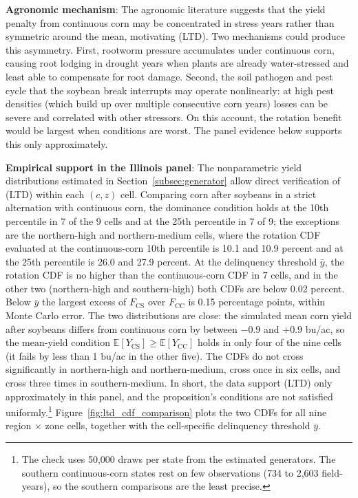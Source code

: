\documentclass[11pt,letterpaper]{article}
\theoremstyle{remark}
\begin{document}
\textbf{Agronomic mechanism}: The agronomic literature suggests that the yield penalty from continuous corn may be concentrated in stress years rather than symmetric around the mean, motivating (LTD). Two mechanisms could produce this asymmetry. First, rootworm pressure accumulates under continuous corn, causing root lodging in drought years when plants are already water-stressed and least able to compensate for root damage. Second, the soil pathogen and pest cycle that the soybean break interrupts may operate nonlinearly: at high pest densities (which build up over multiple consecutive corn years) losses can be severe and correlated with other stressors. On this account, the rotation benefit would be largest when conditions are worst. The panel evidence below supports this only approximately.
 
\textbf{Empirical support in the Illinois panel}: The nonparametric yield distributions estimated in Section~\ref{subsec:generator} allow direct verification of (LTD) within each $(c,z)$ cell. Comparing corn after soybeans in a strict alternation with continuous corn, the dominance condition holds at the 10th percentile in 7 of the 9 cells and at the 25th percentile in 7 of 9; the exceptions are the northern-high and northern-medium cells, where the rotation CDF evaluated at the continuous-corn 10th percentile is 10.1 and 10.9 percent and at the 25th percentile is 26.0 and 27.9 percent. At the delinquency threshold $\bar{y}$, the rotation CDF is no higher than the continuous-corn CDF in 7 cells, and in the other two (northern-high and southern-high) both CDFs are below 0.02 percent. Below $\bar{y}$ the largest excess of $F_{\text{CS}}$ over $F_{\text{CC}}$ is 0.15 percentage points, within Monte Carlo error. The two distributions are close: the simulated mean corn yield after soybeans differs from continuous corn by between $-0.9$ and $+0.9$ bu/ac, so the mean-yield condition $\mathbb{E}[Y_{\text{CS}}] \geq \mathbb{E}[Y_{\text{CC}}]$ holds in only four of the nine cells (it fails by less than 1 bu/ac in the other five). The CDFs do not cross significantly in northern-high and northern-medium, cross once in six cells, and cross three times in southern-medium. In short, the data support (LTD) only approximately in this panel, and the proposition's conditions are not satisfied uniformly.\footnote{The check uses 50,000 draws per state from the estimated generators. The southern continuous-corn states rest on few observations (734 to 2,603 field-years), so the southern comparisons are the least precise.} Figure~\ref{fig:ltd_cdf_comparison} plots the two CDFs for all nine region $\times$ zone cells, together with the cell-specific delinquency threshold $\bar{y}$.
 
\end{document}

